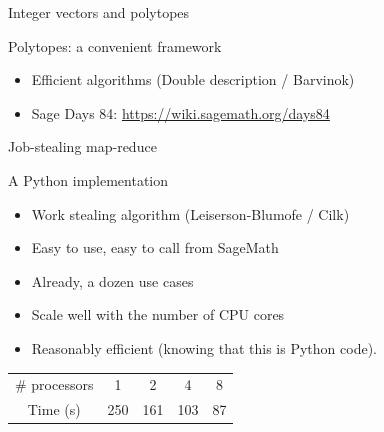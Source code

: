 \documentclass{beamer}
\begin{document}
\begin{frame}{Integer vectors and polytopes}

  \begin{block}{Polytopes: a convenient framework}
   \begin{itemize}
   \item Efficient algorithms (Double description / Barvinok)
   \item Sage Days 84: \url{https://wiki.sagemath.org/days84}
   \end{itemize}
  \end{block}

\end{frame}

\begin{frame}{Job-stealing map-reduce}

  \begin{block}{A Python implementation}
    \begin{itemize}
    \item Work stealing algorithm (Leiserson-Blumofe / Cilk)
    \item Easy to use, easy to call from SageMath
    \item Already, a dozen  use cases
    \item Scale well with the number of CPU cores
    \item Reasonably efficient (knowing that this is Python code).
    \end{itemize}
  \end{block}

  \begin{center}\begin{tabular}{c|cccc}
    \# processors & 1 & 2 & 4 & 8\\
    Time (s) & 250 & 161 & 103 & 87
  \end{tabular}\end{center}
 
\end{frame}
\end{document}
